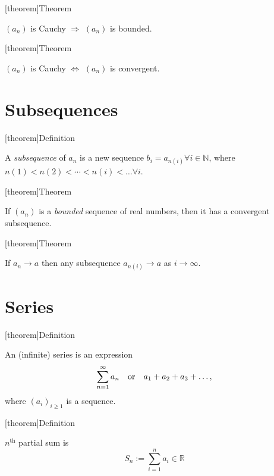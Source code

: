 \documentclass[12pt]{report}
\theoremstyle{definition}
\begin{document}
[theorem]{Theorem}
\begin{cauchy sequence is bounded}
    $(a_n)$ is Cauchy $\Rightarrow$ $(a_n)$ is bounded.
\end{cauchy sequence is bounded}

[theorem]{Theorem}
\begin{cauchy sequence is convergenct}
    $(a_n)$ is Cauchy $\iff$ $(a_n)$ is convergent.
\end{cauchy sequence is convergenct}

\section{Subsequences}
[theorem]{Definition}
\begin{subsequence}
    A \emph{subsequence} of $a_n$ is a new sequence $b_i = a_{n(i)} \forall i \in \mathbb{N}$,
    where $n(1) < n(2) < \cdots < n(i) < \ldots \forall i$.
\end{subsequence}

[theorem]{Theorem}
\begin{Bolzno-Weierstrass}
    If $(a_n)$ is a \emph{bounded} sequence of real numbers, then it has a convergent subsequence.
\end{Bolzno-Weierstrass}

[theorem]{Theorem}
\begin{subsequence converge to the same value}
    If $a_n \rightarrow a$ then any subsequence $a_{n(i)} \rightarrow a$ as $i \rightarrow \infty$.
\end{subsequence converge to the same value}

\section{Series}
[theorem]{Definition}
\begin{series}
    An (infinite) series is an expression \[
        \sum_{n=1}^{\infty} a_n \quad \textnormal{or} \quad a_1 + a_2 + a_3 + \ldots,
    \]where ${(a_i)}_{i \ge 1}$ is a sequence.
\end{series}

[theorem]{Definition}
\begin{partial sum}
    $n^{\text{th}}$ partial sum is\[
        S_n := \sum_{i=1}^{n} a_i \in \mathbb{R}
    \]
\end{partial sum}
\end{document}
